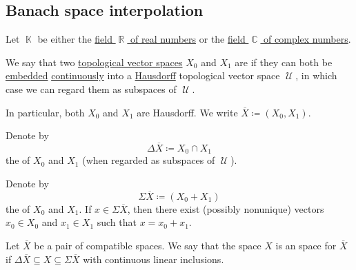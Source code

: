 \subsection{Banach space interpolation}\label{subsec:banach_space_interpolation}

\begin{definition}\label{def:interpolated_topological_vector_space}
  Let \( \BbbK \) be either the \hyperref[def:set_of_real_numbers]{field \( \BbbR \) of real numbers} or the \hyperref[def:set_of_real_numbers]{field \( \BbbC \) of complex numbers}.

  \begin{thmenum}
     We say that two \hyperref[def:topological_vector_space]{topological vector spaces} \( X_0 \) and \( X_1 \) are  if they can both be \hyperref[def:morphism_invertibility/left_cancellative]{embedded} \hyperref[def:global_continuity]{continuously} into a \hyperref[def:separation_axioms/T2]{Hausdorff} topological vector space \( \mscrU \), in which case we can regard them as subspaces of \( \mscrU \).

    In particular, both \( X_0 \) and \( X_1 \) are Hausdorff. We write \( \overline{X} \coloneqq (X_0, X_1) \).

     Denote by
    \begin{equation*}
      \Delta \overline{X} \coloneqq X_0 \cap X_1
    \end{equation*}
    the  of \( X_0 \) and \( X_1 \) (when regarded as subspaces of \( \mscrU \)).

     Denote by
    \begin{equation*}
      \Sigma \overline{X} \coloneqq ( X_0 + X_1 )
    \end{equation*}
    the  of \( X_0 \) and \( X_1 \). If \( x \in \Sigma \overline{X} \), then there exist (possibly nonunique) vectors \( x_0 \in X_0 \) and \( x_1 \in X_1 \) such that \( x = x_0 + x_1 \).

     Let \( \overline{X} \) be a pair of compatible spaces. We say that the space \( X \) is an  space for \( \overline{X} \) if \( \Delta \overline{X} \subseteq X \subseteq \Sigma \overline{X} \) with continuous linear inclusions.


\end{thmenum}
\end{definition}
